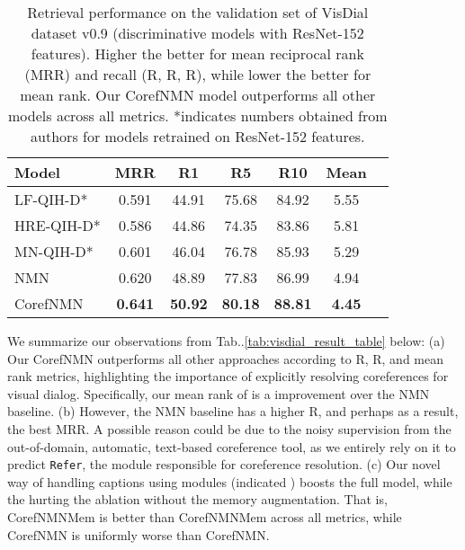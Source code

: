 \documentclass[runningheads]{llncs}
\makeatletter
\def\adl@drawiv#1#2#3{\hskip.5\tabcolsep
        \xleaders#3{#2.5\@tempdimb #1{1}#2.5\@tempdimb}#2\z@ plus1fil minus1fil\relax
        \hskip.5\tabcolsep}
\newcommand{\cdashlinelr}[1]{\noalign{\vskip\aboverulesep
           \global\let\@dashdrawstore\adl@draw
           \global\let\adl@draw\adl@drawiv}
  \cdashline{#1}
  \noalign{\global\let\adl@draw\@dashdrawstore
           \vskip\belowrulesep}}
\DeclareRobustCommand\onedot{\futurelet\@let@token\@onedot}
\def\@onedot{\ifx\@let@token.\else.\null\fi\xspace}
\def\Table{Tab\onedot}
\newcommand{\nmn}{CorefNMN\xspace}
\newcommand{\myparagraph}[1]{\vspace{0pt}\noindent{\bf #1}}
\makeatother
\begin{document}
\begin{table}[t]
	\centering
	\setlength{\tabcolsep}{6pt}
\begin{tabular}{lcccccc}
	\toprule
	\textbf{Model} & \textbf{MRR} & \textbf{R1} & \textbf{R5}
    				& \textbf{R10} & \textbf{Mean} \\\midrule
LF-QIH-D* \cite{visdial} 
    	& 0.591 & 44.91 & 75.68 & 84.92 & 5.55\\
    HRE-QIH-D* \cite{visdial}
    	& 0.586 & 44.86 & 74.35 & 83.86 & 5.81\\
    MN-QIH-D* \cite{visdial}
    	& 0.601 & 46.04 & 76.78 & 85.93 & 5.29\\
    NMN\cite{hu2017learning}
    	& 0.620 & 48.89 & 77.83 & 86.99 & 4.94\\
	\cdashlinelr{1-6}
    \nmn
    	& \textbf{0.641} & \textbf{50.92} & \textbf{80.18} & \textbf{88.81} & \textbf{4.45}\\    
    \bottomrule
	\end{tabular}
\caption{
    Retrieval performance on the validation set of VisDial
    dataset v0.9 \cite{visdial} 
    (discriminative models with ResNet-152 \cite{he16cvpr} features).
    Higher the better for mean reciprocal rank (MRR) and recall 
    (R, R, R), while lower the better for mean rank.
    Our \nmn model outperforms all other models across all metrics.
    *indicates numbers obtained from authors for models retrained on ResNet-152
    features.}
    \label{tab:visdial_disc_result_table_resnet}
\end{table}
% 




\myparagraph{Results.}
We summarize our observations from \Table\ref{tab:visdial_result_table} below:
(a) Our \nmn outperforms all other approaches according to R, R,
  and mean rank metrics, highlighting the importance of explicitly resolving
  coreferences for visual dialog.
  Specifically, our mean rank of  is a  improvement over the NMN 
  baseline.
(b) However, the NMN baseline has a higher R, and perhaps as a result,
	the best MRR.
    A possible reason could be due to the noisy supervision from the 
    out-of-domain, automatic, text-based coreference tool, as we entirely rely
    on it to predict \texttt{Refer}, the module responsible for coreference
    resolution.
(c) Our novel way of handling captions using modules (indicated
	) boosts the full model, while the 
    hurting the ablation without the memory augmentation.
    That is, \nmn{}Mem is better 
    than \nmn{}Mem across all metrics, while 
    \nmn{} is uniformly worse than \nmn.
\end{document}
